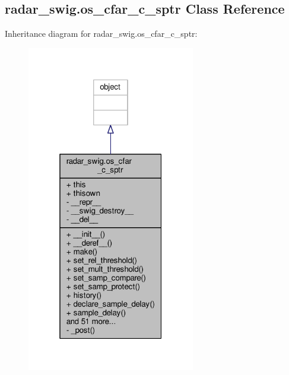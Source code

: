 \subsection{radar\+\_\+swig.\+os\+\_\+cfar\+\_\+c\+\_\+sptr Class Reference}
\label{classradar__swig_1_1os__cfar__c__sptr}


Inheritance diagram for radar\+\_\+swig.\+os\+\_\+cfar\+\_\+c\+\_\+sptr\+:
\nopagebreak
\begin{figure}[H]
\begin{center}
\leavevmode
\includegraphics[width=208pt]{d3/d4c/classradar__swig_1_1os__cfar__c__sptr__inherit__graph}
\end{center}
\end{figure}



